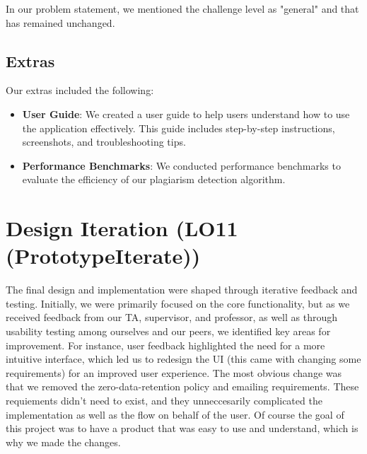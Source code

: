 \documentclass{article}
\begin{document}
In our problem statement, we mentioned the challenge level as "general" and that has remained unchanged.

\subsection{Extras}
Our extras included the following:

\begin{itemize}
    \item \textbf{User Guide}: We created a user guide to help users understand how to use the application effectively. This guide includes step-by-step instructions, screenshots, and troubleshooting tips.
    \item \textbf{Performance Benchmarks}: We conducted performance benchmarks to evaluate the efficiency of our plagiarism detection algorithm.
\end{itemize}

\section{Design Iteration (LO11 (PrototypeIterate))}


The final design and implementation were shaped through iterative feedback and
testing. Initially, we were primarily focused on the core functionality, but as
we received feedback from our TA, supervisor, and professor, as well as through
usability testing among ourselves and our peers, we identified key areas for
improvement. For instance, user feedback highlighted the need for a more intuitive
interface, which led us to redesign the UI (this came with changing some requirements)
for an improved user experience. The most obvious change was that we removed the
zero-data-retention policy and emailing requirements. These requiements didn't
need to exist, and they unneccesarily complicated the implementation as well as
the flow on behalf of the user. Of course the goal of this project was to have
a product that was easy to use and understand, which is why we made the changes.
\end{document}
